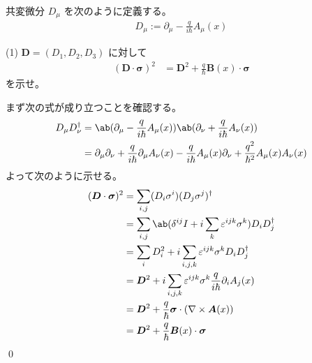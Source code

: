 \documentclass[uplatex,dvipdfmx,a4paper,11pt]{jlreq}
\makeatletter
\newcommand{\vnabla}{\mathbf{\nabla}}
\numberwithin{equation}{section}
\theoremstyle{definition}
\renewenvironment{proof}[1][\proofname]{\par
  \normalfont
  \topsep6\p@\@plus6\p@ \trivlist
  \item[\hskip\labelsep{\bfseries #1}\@addpunct{\bfseries}]\ignorespaces\quad\par
}{%
  \qed\endtrivlist\@endpefalse
}
\renewcommand\proofname{証明}
\makeatother
\begin{document}
\begin{problem}
共変微分 $D_\mu$ を次のように定義する。
\begin{align}
  D_\mu := \partial_\mu - \frac{q}{i\hbar}A_\mu(x)
\end{align}
\end{problem}
(1) $\bm{D} = (D_1, D_2, D_3)$ に対して
\begin{align}
  (\bm{D}\cdot\bm{\sigma})^2 & = \bm{D}^2 + \frac{q}{\hbar}\bm{B}(x)\cdot\bm{\sigma}
\end{align}
を示せ。
\begin{proof}
  まず次の式が成り立つことを確認する。
  \begin{align}
    D_\mu D_\nu^\dagger & = \ab(\partial_\mu - \frac{q}{i\hbar}A_\mu(x))\ab(\partial_\nu + \frac{q}{i\hbar}A_\nu(x))                                                      \\
                        & = \partial_\mu\partial_\nu + \frac{q}{i\hbar}\partial_\mu A_\nu(x) - \frac{q}{i\hbar}A_\mu(x)\partial_\nu + \frac{q^2}{\hbar^2}A_\mu(x)A_\nu(x)
  \end{align}
  よって次のように示せる。
  \begin{align}
    (\bm{D}\cdot\bm{\sigma})^2 & = \sum_{i,j}(D_i\sigma^i)(D_j\sigma^j)^\dagger                                      \\
                               & = \sum_{i,j}\ab(\delta^{ij}I + i\sum_{k}\varepsilon^{ijk}\sigma^k)D_iD_j^\dagger    \\
                               & = \sum_{i}D_i^2 + i\sum_{i,j,k}\varepsilon^{ijk}\sigma^kD_iD_j^\dagger              \\
                               & = \bm{D}^2 + i\sum_{i,j,k}\varepsilon^{ijk}\sigma^k\frac{q}{i\hbar}\partial_iA_j(x) \\
                               & = \bm{D}^2 + \frac{q}{\hbar}\bm{\sigma}\cdot(\vnabla\times\bm{A}(x))                \\
                               & = \bm{D}^2 + \frac{q}{\hbar}\bm{B}(x)\cdot\bm{\sigma}
  \end{align}
\end{proof}
\end{document}

